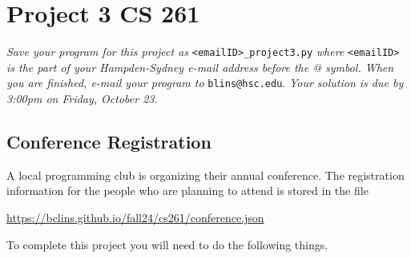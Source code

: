 \documentclass[12pt]{article}
\begin{document}
\section*{Project 3 \hfill CS 261}

\textit{Save your program for this project as} \verb|<emailID>_project3.py| \textit{where} \verb|<emailID>| \textit{is the part of your Hampden-Sydney e-mail address before the @ symbol. When you are finished, e-mail your program to} \verb|blins@hsc.edu|. \textit{Your solution is due by 3:00pm on Friday, October 23. }

%   
%   

\subsection*{Conference Registration}

A local programming club is organizing their annual conference.  The registration information for the people who are planning to attend is stored in the file 
\begin{center}
\url{https://bclins.github.io/fall24/cs261/conference.json}
\end{center}
To complete this project you will need to do the following things.
\end{document}
